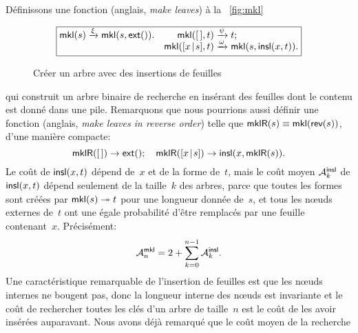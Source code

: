 \hspace*{-3pt} Définissons une fonction 
 (anglais, \emph{make leaves}) à la
\fig~\vref{fig:mkl}
\begin{figure}
\begin{equation*}
\boxed{
\begin{array}{@{}r@{\;}l@{\;}lr@{\;}l@{\;}l@{}}
  \fun{mkl}(s) & \xrightarrow{\smash{\xi}} & \fun{mkl}(s,\fun{ext}()).
& \fun{mkl}(\el,t) & \xrightarrow{\smash{\psi}} & t;\\
& & & \fun{mkl}(\cons{x}{s},t) & \xrightarrow{\smash{\omega}} & \fun{mkl}(s,\fun{insl}(x,t)).
\end{array}}
\end{equation*}
\caption{Créer un arbre avec des insertions de feuilles}
\label{fig:mkl}
\end{figure}
qui construit un arbre binaire de recherche en insérant des feuilles
dont le contenu est donné dans une pile. Remarquons que nous pourrions
aussi définir une fonction 
(anglais, \emph{make leaves in reverse order}) telle que
\(\fun{mklR}(s) \equiv \fun{mkl}(\fun{rev}(s))\), d'une manière
compacte:
\begin{equation}
  \fun{mklR}(\el) \rightarrow \fun{ext}();
  \quad
  \fun{mklR}(\cons{x}{s}) \rightarrow \fun{insl}(x,\fun{mklR}(s)).
\label{eq:mklR}
\end{equation}
Le coût de \(\fun{insl}(x,t)\) dépend de~\(x\) et de la forme
de~\(t\), mais le coût moyen
\(\M{\fun{insl}}{k}\) de
\(\fun{insl}(x,t)\) dépend seulement de la taille~\(k\) des arbres,
parce que toutes les formes sont créées par \(\fun{mkl}(s)
\twoheadrightarrow t\) pour une longueur donnée de~\(s\), et tous les
n{\oe}uds externes de~\(t\) ont une égale probabilité d'être remplacés
par une feuille contenant~\(x\). Précisément:
\begin{equation}
\abovedisplayskip=2pt
\abovedisplayshortskip=2pt
\belowdisplayskip=4pt
\M{\fun{mkl}}{n} = 2 + \sum_{k=0}^{n-1}\M{\fun{insl}}{k}.
\label{eq:Mmkl0}
\end{equation}
Une caractéristique remarquable de l'insertion de feuilles est que les
n{\oe}uds internes ne bougent pas, donc la longueur
interne des
n{\oe}uds est invariante et le coût de rechercher toutes les clés d'un
arbre de taille~\(n\) est le coût de les avoir insérées
auparavant. Nous avons déjà remarqué que le coût moyen de la recherche
